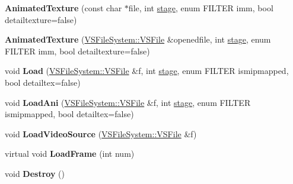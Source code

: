 \begin{DoxyCompactItemize}
\item 
{\bfseries Animated\+Texture} (const char $\ast$file, int \hyperlink{classTexture_aa38999434f9fcf409ca20b4523852b7b}{stage}, enum F\+I\+L\+T\+ER imm, bool detailtexture=false)\hypertarget{classAnimatedTexture_a367812df19c6bf462c19d63cea5d4c44}{}\label{classAnimatedTexture_a367812df19c6bf462c19d63cea5d4c44}

\item 
{\bfseries Animated\+Texture} (\hyperlink{classVSFileSystem_1_1VSFile}{V\+S\+File\+System\+::\+V\+S\+File} \&openedfile, int \hyperlink{classTexture_aa38999434f9fcf409ca20b4523852b7b}{stage}, enum F\+I\+L\+T\+ER imm, bool detailtexture=false)\hypertarget{classAnimatedTexture_aac18eaa3d1acabf45bd0dce210781876}{}\label{classAnimatedTexture_aac18eaa3d1acabf45bd0dce210781876}

\item 
void {\bfseries Load} (\hyperlink{classVSFileSystem_1_1VSFile}{V\+S\+File\+System\+::\+V\+S\+File} \&f, int \hyperlink{classTexture_aa38999434f9fcf409ca20b4523852b7b}{stage}, enum F\+I\+L\+T\+ER ismipmapped, bool detailtex=false)\hypertarget{classAnimatedTexture_aecd10d6ff9927da3e2248bec89e862fa}{}\label{classAnimatedTexture_aecd10d6ff9927da3e2248bec89e862fa}

\item 
void {\bfseries Load\+Ani} (\hyperlink{classVSFileSystem_1_1VSFile}{V\+S\+File\+System\+::\+V\+S\+File} \&f, int \hyperlink{classTexture_aa38999434f9fcf409ca20b4523852b7b}{stage}, enum F\+I\+L\+T\+ER ismipmapped, bool detailtex=false)\hypertarget{classAnimatedTexture_a6072aa83242801ace718d65e5d3e866d}{}\label{classAnimatedTexture_a6072aa83242801ace718d65e5d3e866d}

\item 
void {\bfseries Load\+Video\+Source} (\hyperlink{classVSFileSystem_1_1VSFile}{V\+S\+File\+System\+::\+V\+S\+File} \&f)\hypertarget{classAnimatedTexture_ac97c0b40d46a2a058b31213a2c720490}{}\label{classAnimatedTexture_ac97c0b40d46a2a058b31213a2c720490}

\item 
virtual void {\bfseries Load\+Frame} (int num)\hypertarget{classAnimatedTexture_aec78d972c6094ae112100f48a4c90b7c}{}\label{classAnimatedTexture_aec78d972c6094ae112100f48a4c90b7c}

\item 
void {\bfseries Destroy} ()\hypertarget{classAnimatedTexture_a8c6b85b8d2b0ca80a2e764370d09e7bb}{}\label{classAnimatedTexture_a8c6b85b8d2b0ca80a2e764370d09e7bb}


\end{DoxyCompactItemize}
